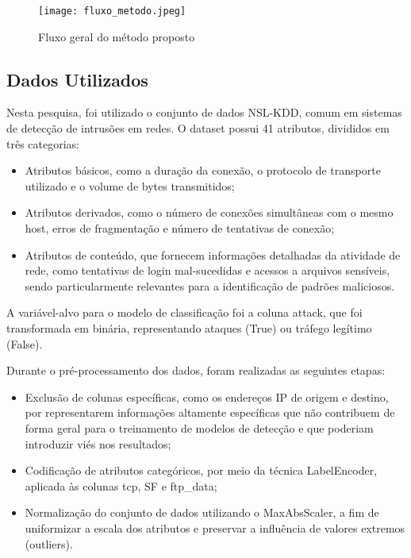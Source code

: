 \documentclass[conference]{IEEEtran}
\begin{document}
    \begin{figure}
        \centering
        \texttt{[image: fluxo\_metodo.jpeg]}
        \caption{Fluxo geral do método proposto }
        \label{fig:enter-label}
    \end{figure}

\subsection{Dados Utilizados}
      
    Nesta pesquisa, foi utilizado o conjunto de dados NSL-KDD, comum em sistemas de detecção de intrusões em redes. O dataset possui 41 atributos, divididos em três categorias: 

    \begin{itemize}
        \item Atributos básicos, como a duração da conexão, o protocolo de transporte utilizado e o volume de bytes transmitidos;
        \item Atributos derivados, como o número de conexões simultâneas com o mesmo host, erros de fragmentação e número de tentativas de conexão;
        \item Atributos de conteúdo, que fornecem informações detalhadas da atividade de rede, como tentativas de login mal-sucedidas e acessos a arquivos sensíveis, sendo particularmente relevantes para a identificação de padrões maliciosos.
    \end{itemize}
    
    A variável-alvo para o modelo de classificação foi a coluna attack, que foi transformada em binária, representando ataques (True) ou tráfego legítimo (False).

    Durante o pré-processamento dos dados, foram realizadas as seguintes etapas:

    \begin{itemize}
        \item Exclusão de colunas específicas, como os endereços IP de origem e destino, por representarem informações altamente específicas que não contribuem de forma geral para o treinamento de modelos de detecção e que poderiam introduzir viés nos resultados;
    \item Codificação de atributos categóricos, por meio da técnica LabelEncoder, aplicada às colunas tcp, SF e ftp\_data;
        \item Normalização do conjunto de dados utilizando o MaxAbsScaler, a fim de uniformizar a escala dos atributos e preservar a influência de valores extremos (outliers).
    \end{itemize}
    
\end{document}
